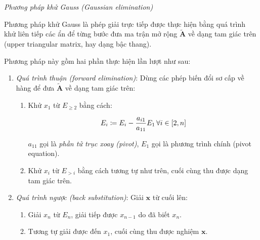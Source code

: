 \documentclass[../../Lectures]{subfiles}
\begin{document}
\begin{method}\label{method:gauss_elimination}
    \emph{Phương pháp khử Gauss (Gaussian elimination)}

    Phương pháp khử Gauss là phép giải trực tiếp được thực hiện bằng quá trình
    khử liên tiếp các ẩn để từng bước đưa ma trận mở rộng \(\bm{\tilde{A}}\) về
    dạng tam giác trên (upper triangular matrix, hay dạng bậc thang).

    Phương pháp này gồm hai phần thực hiện lần lượt như sau:

    \begin{enumerate}
        \item \emph{Quá trình thuận (forward elimination)}: Dùng các phép biến
            đổi sơ cấp về hàng để đưa \(\bm{\tilde{A}}\) về dạng tam giác trên:

            \begin{enumerate}
                \item Khử \(x_1\) từ \(E_{\geq 2}\) bằng cách:

                    \[E_i \coloneqq E_i - \frac{a_{i1}}{a_{11}} E_1 \, \forall i \in \interval{2}{n}\]

                    \(a_{11}\) gọi là \emph{phần tử trục xoay (pivot)}, \(E_1\)
                    gọi là phương trình chính (pivot equation).

                \item Khử \(x_i\) từ \(E_{> i}\) bằng cách tương tự như trên,
                    cuối cùng thu được dạng tam giác trên.
            \end{enumerate}

        \item \emph{Quá trình ngược (back substitution)}: Giải \(\bm{x}\) từ
            cuối lên:

            \begin{enumerate}
                \item Giải \(x_n\) từ \(E_n\), giải tiếp được \(x_{n - 1}\) do
                    đã biết \(x_n\).

                \item Tương tự giải được đến \(x_1\), cuối cùng thu được nghiệm
                    \(\bm{x}\).
            \end{enumerate}
    \end{enumerate}
\end{method}
\end{document}
